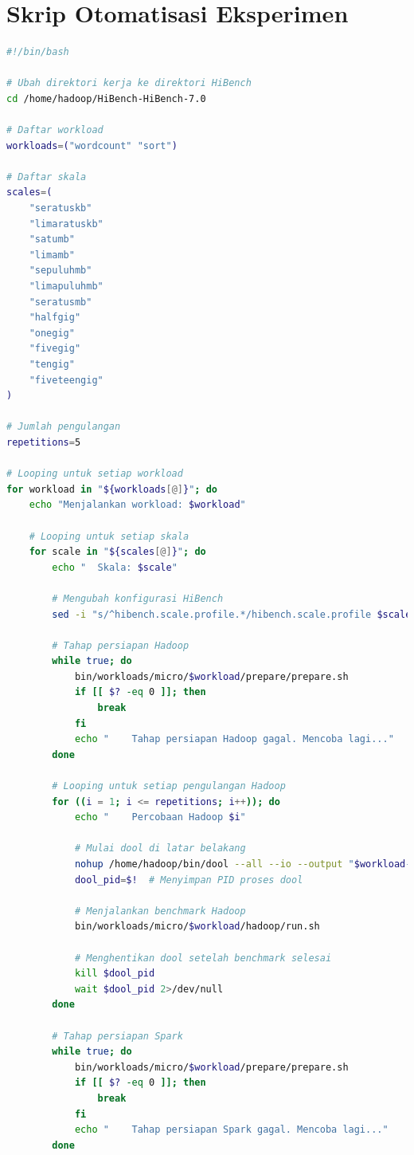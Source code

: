 

\chapter{Skrip Otomatisasi Eksperimen}
\label{appendix:F}

\begin{lstlisting}[language=bash]
#!/bin/bash

# Ubah direktori kerja ke direktori HiBench
cd /home/hadoop/HiBench-HiBench-7.0

# Daftar workload
workloads=("wordcount" "sort")

# Daftar skala
scales=(
    "seratuskb"
    "limaratuskb"
    "satumb"
    "limamb"
    "sepuluhmb"
    "limapuluhmb"
    "seratusmb"
    "halfgig"
    "onegig"
    "fivegig"
    "tengig"
    "fiveteengig"
)

# Jumlah pengulangan
repetitions=5

# Looping untuk setiap workload
for workload in "${workloads[@]}"; do
    echo "Menjalankan workload: $workload"

    # Looping untuk setiap skala
    for scale in "${scales[@]}"; do
        echo "  Skala: $scale"

        # Mengubah konfigurasi HiBench
        sed -i "s/^hibench.scale.profile.*/hibench.scale.profile $scale/" conf/hibench.conf

        # Tahap persiapan Hadoop
        while true; do
            bin/workloads/micro/$workload/prepare/prepare.sh
            if [[ $? -eq 0 ]]; then
                break
            fi
            echo "    Tahap persiapan Hadoop gagal. Mencoba lagi..."
        done

        # Looping untuk setiap pengulangan Hadoop
        for ((i = 1; i <= repetitions; i++)); do
            echo "    Percobaan Hadoop $i"

            # Mulai dool di latar belakang
            nohup /home/hadoop/bin/dool --all --io --output "$workload-$scale-$i-hadoop.csv" --bytes > /dev/null 2>&1 &
            dool_pid=$!  # Menyimpan PID proses dool

            # Menjalankan benchmark Hadoop
            bin/workloads/micro/$workload/hadoop/run.sh

            # Menghentikan dool setelah benchmark selesai
            kill $dool_pid
            wait $dool_pid 2>/dev/null
        done

        # Tahap persiapan Spark 
        while true; do
            bin/workloads/micro/$workload/prepare/prepare.sh
            if [[ $? -eq 0 ]]; then
                break
            fi
            echo "    Tahap persiapan Spark gagal. Mencoba lagi..."
        done


\end{lstlisting}

